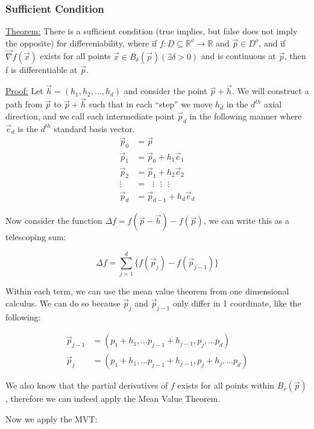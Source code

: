 \documentclass[11 pt, twoside]{article}
\begin{document}
\subsubsection{Sufficient Condition}

\underline{Theorem:}
There is a sufficient condition (true implies, but false does not imply the opposite) for differeniability, where if $f: D \subseteq \mathbb{R^d} \to \mathbb{R}$ and $\vec{p} \in D^o$, and if $\vec{\nabla}f(\vec{x})$ exists for all points $\vec{x} \in B_\delta (\vec{p}) (\exists \delta > 0)$ and is continuous at $\vec{p}$, then f is differentiable at $\vec{p}$.

\underline{Proof:}
Let $\vec{h} = (h_1, h_2, \dots, h_d)$ and consider the point $\vec{p} +
\vec{h}$. We will construct a path from $\vec{p}$ to $\vec{p} + \vec{h}$ such
that in each ``step'' we move $h_d$ in the $d^{th}$ axial direction, and we call
each intermediate point $\vec{p}_d$ in the following manner where $\vec{e}_d$ is
the $d^{th}$ standard basis vector.
\begin{align*}
\vec{p}_0 &= \vec{p}\\
\vec{p}_1 &= \vec{p}_0 + h_1 \vec{e}_1\\
\vec{p}_2 &= \vec{p}_1 + h_2 \vec{e}_2\\
\vdots &= \text{     } \vdots \text{     } \vdots \text{     } \vdots\\
\vec{p}_d &= \vec{p}_{d-1} + h_d \vec{e}_d
\end{align*}

Now consider the function $\Delta f = f(\vec{p} - \vec{h}) - f(\vec{p})$, we can
write this as a telescoping sum:

$$\Delta f = \sum_{j=1}^d \{f(\vec{p}_j) - f(\vec{p}_{j-1})\}$$

Within each term, we can use the mean value theorem from one dimensional
calculus. We can do so because $\vec{p}_j$ and $\vec{p}_{j - 1}$ only differ in
1 coordinate, like the following:

\begin{align*}
\vec{p}_{j - 1} &= (p_1 + h_1, \dots p_{j-1} + h_{j-1}, \boxed{p_j}, \dots p_d)\\
\vec{p}_{j} &= (p_1 + h_1, \dots p_{j-1} + h_{j-1}, \boxed{p_j + h_j}, \dots p_d)
\end{align*}

We also know that the partial derivatives of $f$ exists for all points within
$B_r(\vec{p})$, therefore we can indeed apply the Mean Value Theorem.

Now we apply the MVT:
\end{document}

